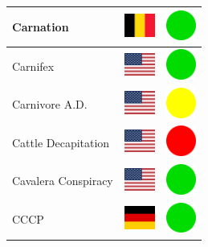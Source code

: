 \documentclass[12pt, a4paper, twoside]{report}
\begin{document}
\begin{center}
\begin{longtable}{|p{5cm}|p{2cm}|p{2cm}|}
 Carnation                                                  & \includegraphics[width=1cm]{../img/flags/be} &   \includegraphics[width=1cm]{../likes/y} \\ \hline
 Carnifex                                                   & \includegraphics[width=1cm]{../img/flags/us} &   \includegraphics[width=1cm]{../likes/y} \\ \hline
 Carnivore A.D.                                             & \includegraphics[width=1cm]{../img/flags/us} &   \includegraphics[width=1cm]{../likes/m} \\ \hline
 Cattle Decapitation                                        & \includegraphics[width=1cm]{../img/flags/us} &   \includegraphics[width=1cm]{../likes/n} \\ \hline
 Cavalera Conspiracy                                        & \includegraphics[width=1cm]{../img/flags/us} &   \includegraphics[width=1cm]{../likes/y} \\ \hline
 CCCP                                                       & \includegraphics[width=1cm]{../img/flags/de} &   \includegraphics[width=1cm]{../likes/y} \\ \hline

\end{longtable}
\end{center}
\end{document}
